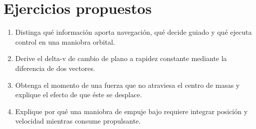 \section{Ejercicios propuestos}
\begin{enumerate}
\item Distinga qué información aporta navegación, qué decide guiado y qué ejecuta control en una maniobra orbital.
\item Derive el delta-v de cambio de plano a rapidez constante mediante la diferencia de dos vectores.
\item Obtenga el momento de una fuerza que no atraviesa el centro de masas y explique el efecto de que éste se desplace.
\item Explique por qué una maniobra de empuje bajo requiere integrar posición y velocidad mientras consume propulsante.
\end{enumerate}
